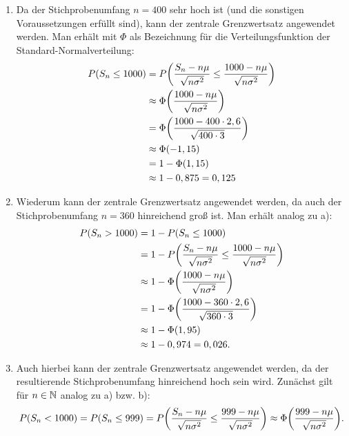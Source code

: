 \documentclass{exercise}
\begin{document}
    \begin{enumerate}
        \item Da der Stichprobenumfang \(n = 400\) sehr hoch ist (und die sonstigen Voraussetzungen erfüllt sind), kann der zentrale Grenzwertsatz angewendet werden.
        Man erhält mit \(\Phi\) als Bezeichnung für die Verteilungsfunktion der Standard-Normalverteilung:
        \begin{align*}
            P\parentheses*{S_n \le 1000} &= P\parentheses*{\frac{S_n - n\mu}{\sqrt{n\sigma^2}} \le \frac{1000 - n\mu}{\sqrt{n\sigma^2}}}\\
            &\approx \Phi\parentheses*{\frac{1000 - n\mu}{\sqrt{n\sigma^2}}}\\
            &= \Phi\parentheses*{\frac{1000 - 400 \cdot 2,6}{\sqrt{400 \cdot 3}}}\\
            &\approx \Phi\parentheses*{-1,15}\\
            &= 1 - \Phi\parentheses*{1,15}\\
            &\approx 1 - 0,875 = 0,125
        \end{align*}
        \item Wiederum kann der zentrale Grenzwertsatz angewendet werden, da auch der Stichprobenumfang \(n = 360\) hinreichend groß ist.
        Man erhält analog zu a):
        \begin{align*}
            P\parentheses*{S_n > 1000} &= 1 - P\parentheses*{S_n \le 1000}\\
            &= 1 - P\parentheses*{\frac{S_n - n\mu}{\sqrt{n\sigma^2}} \le \frac{1000 - n\mu}{\sqrt{n\sigma^2}}}\\
            &\approx 1 - \Phi\parentheses*{\frac{1000 - n\mu}{\sqrt{n\sigma^2}}}\\
            &= 1 - \Phi\parentheses*{\frac{1000 - 360 \cdot 2,6}{\sqrt{360 \cdot 3}}}\\
            &\approx 1 - \Phi\parentheses*{1,95}\\
            &\approx 1- 0,974 = 0,026.
        \end{align*}
        \item Auch hierbei kann der zentrale Grenzwertsatz angewendet werden, da der resultierende Stichprobenumfang hinreichend hoch sein wird.
        Zunächst gilt für \(n \in \mathbb{N}\) analog zu a) bzw. b):
        \[
            P\parentheses*{S_n < 1000} = P\parentheses*{S_n \le 999} = P\parentheses*{\frac{S_n - n\mu}{\sqrt{n\sigma^2}} \le \frac{999 - n\mu}{\sqrt{n\sigma^2}}} \approx \Phi\parentheses*{\frac{999 - n\mu}{\sqrt{n\sigma^2}}}.
\]
\end{enumerate}
\end{document}
